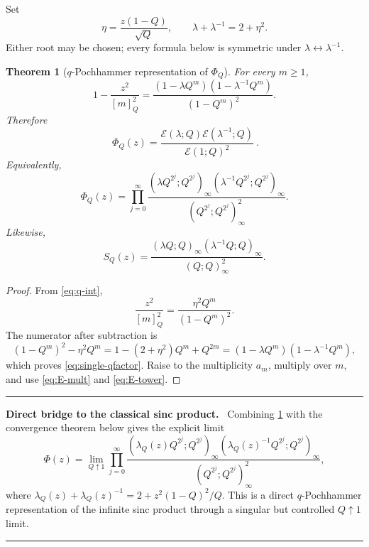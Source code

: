 \documentclass[11pt,oneside]{article}
\numberwithin{equation}{section}
\theoremstyle{plain}
\newtheorem{theorem}{Theorem}[section]
\theoremstyle{definition}
\theoremstyle{remark}
\newcommand{\Ecal}{\mathscr E}
\newenvironment{resultbox}[1]{%
  \par\medskip\noindent\begin{minipage}{\textwidth}%
  \color{DeepGreen}\hrule\vspace{5pt}%
  \color{black}\textbf{\color{DeepGreen}#1.}\ }{%
  \par\vspace{5pt}\color{DeepGreen}\hrule
  \end{minipage}\par\medskip}
\begin{document}
Set
\begin{equation}\label{eq:eta-lambda}
 \eta=\frac{z(1-Q)}{\sqrt Q},
 \qquad
 \lambda+\lambda^{-1}=2+\eta^2.
\end{equation}
Either root may be chosen; every formula below is symmetric under $\lambda\leftrightarrow\lambda^{-1}$.

\begin{theorem}[$q$-Pochhammer representation of $\Phi_Q$]\label{thm:PhiQ-pch}
For every $m\ge1$,
\begin{equation}\label{eq:single-qfactor}
 1-\frac{z^2}{[m]_Q^2}
 =\frac{(1-\lambda Q^m)(1-\lambda^{-1}Q^m)}{(1-Q^m)^2}.
\end{equation}
Therefore
\begin{equation}\label{eq:PhiQ-E}
 \boxed{\ \Phi_Q(z)
 =\frac{\Ecal(\lambda;Q)\Ecal(\lambda^{-1};Q)}{\Ecal(1;Q)^2}\ }.
\end{equation}
Equivalently,
\begin{equation}\label{eq:PhiQ-tower}
 \Phi_Q(z)=\prod_{j=0}^{\infty}
 \frac{(\lambda Q^{2^j};Q^{2^j})_\infty
       (\lambda^{-1}Q^{2^j};Q^{2^j})_\infty}
      {(Q^{2^j};Q^{2^j})_\infty^2}.
\end{equation}
Likewise,
\begin{equation}\label{eq:SQ-pch}
 S_Q(z)=
 \frac{(\lambda Q;Q)_\infty(\lambda^{-1}Q;Q)_\infty}
      {(Q;Q)_\infty^2}.
\end{equation}
\end{theorem}

\begin{proof}
From \cref{eq:q-int},
\[
 \frac{z^2}{[m]_Q^2}
 =\frac{\eta^2Q^m}{(1-Q^m)^2}.
\]
The numerator after subtraction is
\[
 (1-Q^m)^2-\eta^2Q^m
 =1-(2+\eta^2)Q^m+Q^{2m}
 =(1-\lambda Q^m)(1-\lambda^{-1}Q^m),
\]
which proves \cref{eq:single-qfactor}.  Raise to the multiplicity $a_m$, multiply over $m$, and use \cref{eq:E-mult} and \cref{eq:E-tower}.
\end{proof}

\begin{resultbox}{Direct bridge to the classical sinc product}
Combining \cref{thm:PhiQ-pch} with the convergence theorem below gives the explicit limit
\[
 \Phi(z)=\lim_{Q\uparrow1}
 \prod_{j=0}^{\infty}
 \frac{(\lambda_Q(z)Q^{2^j};Q^{2^j})_\infty
       (\lambda_Q(z)^{-1}Q^{2^j};Q^{2^j})_\infty}
      {(Q^{2^j};Q^{2^j})_\infty^2},
\]
where $\lambda_Q(z)+\lambda_Q(z)^{-1}=2+z^2(1-Q)^2/Q$.  This is a direct $q$-Pochhammer representation of the infinite sinc product through a singular but controlled $Q\uparrow1$ limit.
\end{resultbox}
\end{document}
